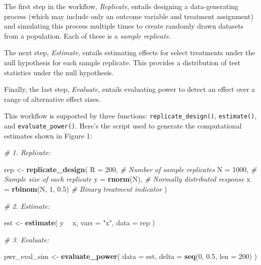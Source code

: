 \documentclass[
  12pt,
]{book}
\newenvironment{Shaded}{\begin{snugshade}}{\end{snugshade}}
\newcommand{\CommentTok}[1]{\textcolor[rgb]{0.56,0.35,0.01}{\textit{#1}}}
\newcommand{\DataTypeTok}[1]{\textcolor[rgb]{0.13,0.29,0.53}{#1}}
\newcommand{\DecValTok}[1]{\textcolor[rgb]{0.00,0.00,0.81}{#1}}
\newcommand{\FloatTok}[1]{\textcolor[rgb]{0.00,0.00,0.81}{#1}}
\newcommand{\KeywordTok}[1]{\textcolor[rgb]{0.13,0.29,0.53}{\textbf{#1}}}
\newcommand{\NormalTok}[1]{#1}
\newcommand{\OperatorTok}[1]{\textcolor[rgb]{0.81,0.36,0.00}{\textbf{#1}}}
\newcommand{\StringTok}[1]{\textcolor[rgb]{0.31,0.60,0.02}{#1}}
\theoremstyle{definition}
\theoremstyle{definition}
\theoremstyle{definition}
\theoremstyle{remark}
\begin{document}
The first step in the workflow, \emph{Replicate}, entails designing a
data-generating process (which may include only an outcome variable and
treatment assignment) and simulating this process multiple times to
create randomly drawn datasets from a population. Each of these is a
\emph{sample replicate}.

The next step, \emph{Estimate}, entails estimating effects for select
treatments under the null hypothesis for each sample replicate. This
provides a distribution of test statistics under the null hypothesis.

Finally, the last step, \emph{Evaluate}, entails evaluating power to
detect an effect over a range of alternative effect sizes.

This workflow is supported by three functions:
\texttt{replicate\_design()}, \texttt{estimate()}, and
\texttt{evaluate\_power()}. Here's the script used to generate the
computational estimates shown in Figure 1:

\begin{Shaded}
\begin{Highlighting}[]
\CommentTok{# 1. Replicate:}

\NormalTok{rep <-}\StringTok{ }\KeywordTok{replicate_design}\NormalTok{(}
  \DataTypeTok{R =} \DecValTok{200}\NormalTok{, }\CommentTok{# Number of sample replicates}
  \DataTypeTok{N =} \DecValTok{1000}\NormalTok{, }\CommentTok{# Sample size of each replicate}
  \DataTypeTok{y =} \KeywordTok{rnorm}\NormalTok{(N), }\CommentTok{# Normally distributed response}
  \DataTypeTok{x =} \KeywordTok{rbinom}\NormalTok{(N, }\DecValTok{1}\NormalTok{, }\FloatTok{0.5}\NormalTok{) }\CommentTok{# Binary treatment indicator}
\NormalTok{)}

\CommentTok{# 2. Estimate:}

\NormalTok{est <-}\StringTok{ }\KeywordTok{estimate}\NormalTok{(}
\NormalTok{  y }\OperatorTok{~}\StringTok{ }\NormalTok{x,}
  \DataTypeTok{vars =} \StringTok{"x"}\NormalTok{, }\DataTypeTok{data =}\NormalTok{ rep}
\NormalTok{)}

\CommentTok{# 3. Evaluate:}

\NormalTok{pwr_eval_sim <-}\StringTok{ }\KeywordTok{evaluate_power}\NormalTok{(}
  \DataTypeTok{data =}\NormalTok{ est,}
  \DataTypeTok{delta =} \KeywordTok{seq}\NormalTok{(}\DecValTok{0}\NormalTok{, }\FloatTok{0.5}\NormalTok{, }\DataTypeTok{len =} \DecValTok{200}\NormalTok{)}
\NormalTok{)}
\end{Highlighting}
\end{Shaded}
\end{document}
